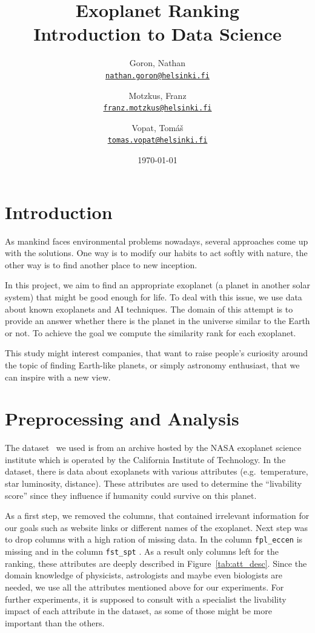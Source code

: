 \documentclass[12p]{article}
\title{Exoplanet Ranking \\\large Introduction to Data Science}
\date{\today}
\author{
    Goron, Nathan \\ \texttt{\href{mailto:nathan.goron@helsinki.fi}{nathan.goron@helsinki.fi}}
    \and 
    Motzkus, Franz \\ \texttt{\href{mailto:franz.motzkus@helsinki.fi}{franz.motzkus@helsinki.fi}}
    \and 
    Vopat, Tomáš  \\ \texttt{\href{mailto:tomas.vopat@helsinki.fi}{tomas.vopat@helsinki.fi}}
}
\begin{document}
\maketitle

\section{Introduction}

As mankind faces environmental problems nowadays, several approaches come up with the solutions. One way is to modify our habits to act softly with nature, the other way is to find another place to new inception.

In this project, we aim to find an appropriate exoplanet (a planet in another solar system) that might be good enough for life. To deal with this issue, we use data about known exoplanets and AI techniques. The domain of this attempt is to provide an answer whether there is the planet in the universe similar to the Earth or not. To achieve the goal we compute the similarity rank for each exoplanet.

This study might interest companies, that want to raise people's curiosity around the topic of finding Earth-like planets, or simply astronomy enthusiast, that we can inspire with a new view.


\section{Preprocessing and Analysis}
The dataset~\cite{dataset} we used is from an archive hosted by the NASA exoplanet science institute which is operated by the California Institute of Technology. In the dataset, there is data about  exoplanets with  various attributes (e.g.\ temperature, star luminosity, distance). These attributes are used to determine the ``livability score'' since they influence if humanity could survive on this planet.

As a first step, we removed the columns, that contained irrelevant information for our goals such as website links or different names of the exoplanet. Next step was to drop columns with a high ration of missing data. In the column \verb|fpl_eccen| is  missing and in the column \verb|fst_spt| . As a result only  columns left for the ranking, these attributes are deeply described in Figure~\ref{tab:att_desc}. Since the domain knowledge of physicists, astrologists and maybe even biologists are needed, we use all the attributes mentioned above for our experiments. For further experiments, it is supposed to consult with a specialist the livability impact of each attribute in the dataset, as some of those might be more important than the others.
\end{document}
